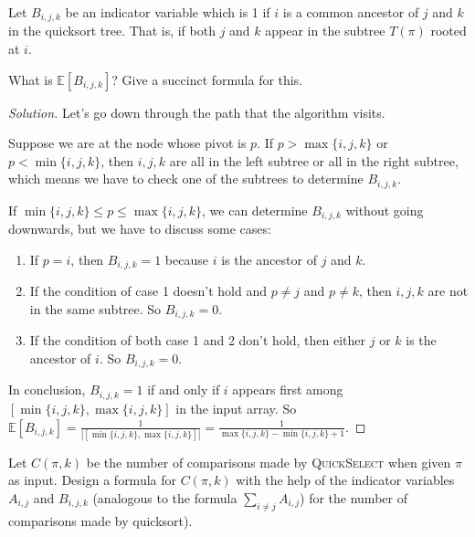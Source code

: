


\maketitle

\begin{thm}{}{}
    Let $B_{i,j,k}$ be an indicator variable which is 1 if $i$ is a common ancestor of  $j$ and $k$ in the quicksort tree. That is, if both $j$ and $k$ appear in the subtree $T(\pi)$ rooted at $i$.
    
    What is $\mathbb{E}[B_{i,j,k}]$? Give a succinct formula for this.
\end{thm}

\begin{proof}[Solution]
	Let's go down through the path that the algorithm visits.
    
  	Suppose we are at the node whose pivot is $p$. If $p > \max\{i,j,k\}$ or $p < \min\{i,j,k\}$, then $i,j,k$ are all in the left subtree or all in the right subtree, which means we have to check one of the subtrees to determine $B_{i,j,k}$.
      
    If $\min\{i,j,k\} \leqslant p \leqslant \max\{i,j,k\}$, we can determine $B_{i,j,k}$ without going downwards, but we have to discuss some cases:
    \begin{enumerate}
        \item If $p=i$, then $B_{i,j,k}=1$ because $i$ is the ancestor of $j$ and $k$.
        \item If the condition of case 1 doesn't hold and $p\ne j$ and $p\ne k$, then $i,j,k$ are not in the same subtree. So $B_{i,j,k}=0$.
        \item If the condition of both case 1 and 2 don't hold, then either $j$ or $k$ is the ancestor of $i$. So $B_{i,j,k}=0$.
    \end{enumerate}
  	
  	In conclusion,  $B_{i,j,k}=1$ if and only if $i$ appears first among $[\min\{i,j,k\},\max\{i,j,k\}]$ in the input array. So  $\mathbb{E}[B_{i,j,k}]=\frac{1}{|[\min\{i,j,k\},\max\{i,j,k\}]|}=\frac{1}{\max\{i,j,k\}-\min\{i,j,k\}+1}$.
\end{proof}

\newpage

\begin{thm}{}{}
	Let $C(\pi,k)$ be the number of comparisons made by \textsc{QuickSelect} when given $\pi$ as input. Design a formula for $C(\pi,k)$ with the help of the indicator variables $A_{i,j}$ and $B_{i,j,k}$ (analogous to the formula $\sum_{i\ne j}A_{i,j}$) for the number of comparisons made by quicksort).
\end{thm}

